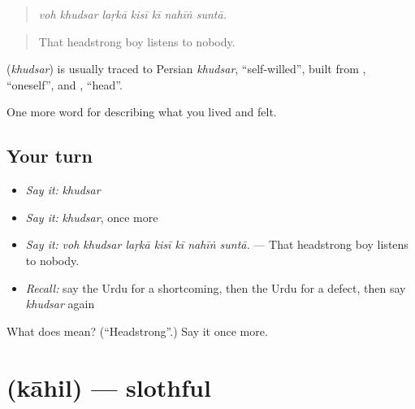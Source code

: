 \begin{quote}
      
\end{quote}

\begin{quote}
\emph{voh khudsar laṛkā kisī kī nahīṅ suntā.}
\end{quote}

\begin{quote}
That headstrong boy listens to nobody.
\end{quote}

\begin{cousinweb}
\textbf{} (\emph{khudsar}) is usually traced to Persian \emph{khudsar}, \textquotedblleft{}self-willed\textquotedblright{}, built from \textbf{}, \textquotedblleft{}oneself\textquotedblright{}, and \textbf{}, \textquotedblleft{}head\textquotedblright{}.
\end{cousinweb}

\begin{grammarlens}[title={What you've built}]
One more word for describing what you lived and felt.
\end{grammarlens}

\subsection*{Your turn}
\begin{itemize}
\raggedright
  \item \emph{Say it:} \emph{khudsar}
  \item \emph{Say it:} \emph{khudsar}, once more
  \item \emph{Say it:} \emph{voh khudsar laṛkā kisī kī nahīṅ suntā.} — That headstrong boy listens to nobody.
  \item \emph{Recall:} say the Urdu for a shortcoming, then the Urdu for a defect, then say \emph{khudsar} again
\end{itemize}

\begin{tcolorbox}[breakable,colback=teal!4,colframe=teal!35!black,title={Before you move on}]
What does  mean? (\textquotedblleft{}Headstrong\textquotedblright{}.) Say it once more.
\end{tcolorbox}
\section[\texorpdfstring{\ur{کاہل} (kāhil)}{کاہل (kāhil)}]{ (kāhil) — slothful}

